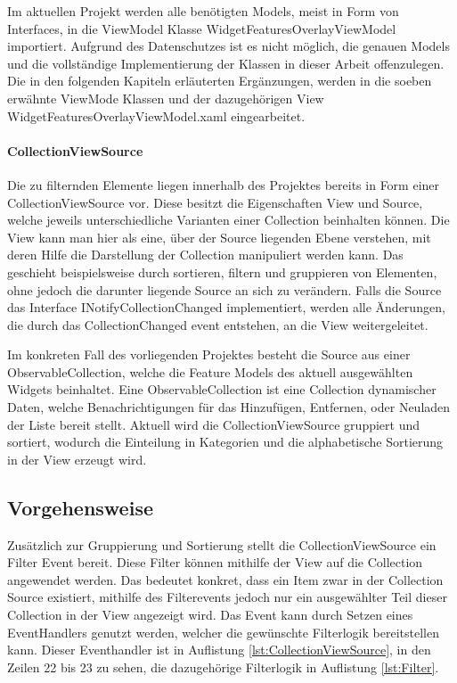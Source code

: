 Im aktuellen Projekt werden alle benötigten Models, meist in Form von Interfaces, in die ViewModel Klasse WidgetFeaturesOverlayViewModel importiert.
Aufgrund des Datenschutzes ist es nicht möglich, die genauen Models und die vollständige Implementierung der Klassen in dieser Arbeit offenzulegen.
Die in den folgenden Kapiteln erläuterten Ergänzungen, werden in die soeben erwähnte ViewMode Klassen und der dazugehörigen View WidgetFeaturesOverlayViewModel.xaml eingearbeitet.

\paragraph{CollectionViewSource}
Die zu filternden Elemente liegen innerhalb des Projektes bereits in Form einer CollectionViewSource vor.
Diese besitzt die Eigenschaften View und Source, welche jeweils unterschiedliche Varianten einer Collection beinhalten können.
Die View kann man hier als eine, über der Source liegenden Ebene verstehen, mit deren Hilfe die Darstellung der Collection manipuliert werden kann.
Das geschieht beispielsweise durch sortieren, filtern und gruppieren von Elementen, ohne jedoch die darunter liegende Source an sich zu verändern.
Falls die Source das Interface INotifyCollectionChanged implementiert, werden alle Änderungen, die durch das CollectionChanged event entstehen, an die View weitergeleitet.\cite{dotnetbot.}

Im konkreten Fall des vorliegenden Projektes besteht die Source aus einer ObservableCollection, welche die Feature Models des aktuell ausgewählten Widgets beinhaltet.
Eine ObservableCollection ist eine Collection dynamischer Daten, welche Benachrichtigungen für das Hinzufügen, Entfernen, oder Neuladen der Liste bereit stellt.
\cite{dotnetbot.c}
Aktuell wird die CollectionViewSource gruppiert und sortiert, wodurch die Einteilung in Kategorien und die alphabetische Sortierung in der View erzeugt wird.

\subsection {Vorgehensweise}
Zusätzlich zur Gruppierung und Sortierung stellt die CollectionViewSource ein Filter Event bereit.
Diese Filter können mithilfe der View auf die Collection angewendet werden. 
Das bedeutet konkret, dass ein Item zwar in der Collection Source existiert, mithilfe des Filterevents jedoch nur ein ausgewählter Teil dieser Collection in der View angezeigt wird.\cite{dotnetbot.b}
Das Event kann durch Setzen eines EventHandlers genutzt werden, welcher die gewünschte Filterlogik bereitstellen kann.
Dieser Eventhandler ist in Auflistung \ref{lst:CollectionViewSource}, in den Zeilen 22 bis 23 zu sehen, die dazugehörige Filterlogik in Auflistung \ref{lst:Filter}.

